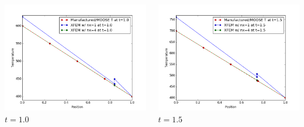 \documentclass[]{beamer}
\begin{document}
\begin{frame}[t]
\begin{columns}
\begin{center}
			\includegraphics[scale=0.17]{figures/1D_xy_homog1mat_u_vs_x_10}\\
			$t=1.0$
			\end{center}
			\begin{center}
			\includegraphics[scale=0.17]{figures/1D_xy_homog1mat_u_vs_x_15}\\
			$t=1.5$			
			
			\null
			

\end{center}
\end{columns}
\end{frame}
\end{document}

